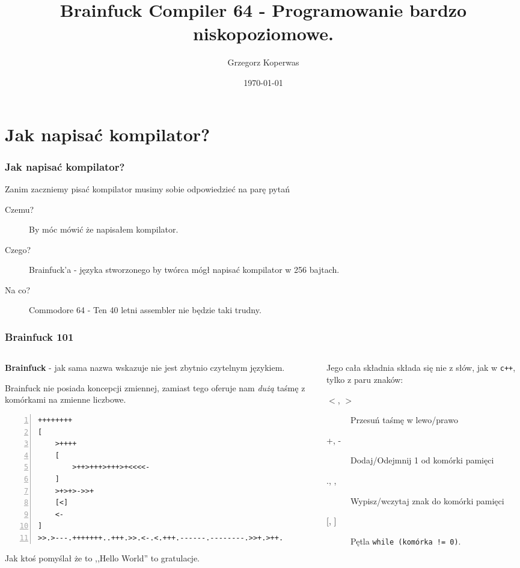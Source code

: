 \documentclass[aspectratio=169]{beamer}
\title[BFC64]{Brainfuck Compiler 64 - Programowanie bardzo niskopoziomowe.}
\author{Grzegorz Koperwas}
\date{\today}
\begin{document}
\begin{frame}
    \titlepage
\end{frame}
\begin{frame}
    \tableofcontents
\end{frame}
\section{Jak napisać kompilator?}
\begin{frame}
    \frametitle{Jak napisać kompilator?}
    Zanim zaczniemy pisać kompilator musimy sobie odpowiedzieć na parę pytań

    \begin{description}
        \item[Czemu?] \pause By móc mówić że napisałem kompilator.
        \item[Czego?] \pause Brainfuck'a - języka stworzonego by twórca mógł napisać kompilator w 256 bajtach.
        \item[Na co?] \pause Commodore 64 - Ten 40 letni assembler nie będzie taki trudny.
    \end{description}
\end{frame}
\begin{frame}[fragile]
    \frametitle{Brainfuck 101}
    \begin{columns}
        \begin{column}{0.5\textwidth}
            \textbf{Brainfuck} - jak sama nazwa wskazuje nie jest zbytnio czytelnym językiem.
            
            Brainfuck nie posiada koncepcji zmiennej, zamiast tego oferuje nam \emph{dużą} taśmę z komórkami na zmienne liczbowe.

            \begin{lstlisting}[frame=L,basicstyle=\tiny\ttfamily,numbers=left]
++++++++
[
    >++++
    [
        >++>+++>+++>+<<<<-
    ]
    >+>+>->>+
    [<]
    <-
]
>>.>---.+++++++..+++.>>.<-.<.+++.------.--------.>>+.>++.
            \end{lstlisting}
            \scriptsize{Jak ktoś pomyślał że to ,,Hello World'' to gratulacje.}

        \end{column}
        \begin{column}{.5\textwidth}
            Jego cała składnia składa się nie z słów, jak w \texttt{c++}, tylko z paru znaków: 

            \begin{description}
                \item[{$<$}, {$>$}] Przesuń taśmę w lewo/prawo
                \item[+, -] Dodaj/Odejmnij 1 od komórki pamięci
                \item[., ,] Wypisz/wczytaj znak do komórki pamięci
                \item[{[, ]}] Pętla \texttt{while~(komórka~!=~0)}.
            \end{description}
        \end{column}
    \end{columns}
\end{frame}
\end{document}
